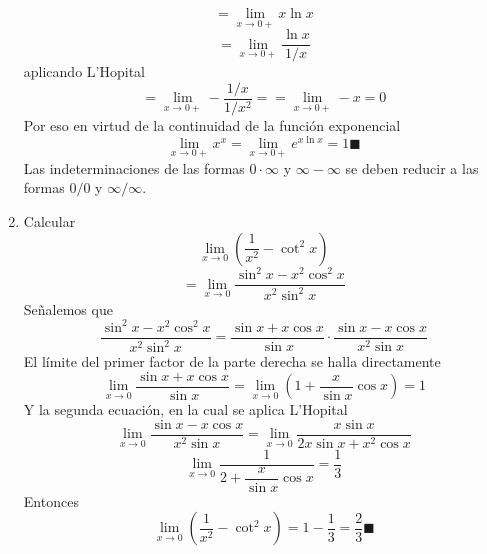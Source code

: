 \documentclass[10pt,twoside]{SelfArx} %
\begin{document}
\begin{enumerate}
\begin{equation}
\end{equation}
   	\begin{equation}
	=\lim\limits_{x\rightarrow0+}x\ln x
   	\end{equation}
   	\begin{equation}
   		=\lim\limits_{x\rightarrow0+}\dfrac{\ln x}{1/x} 
 	\end{equation}
 	aplicando L'Hopital
 	\begin{equation}
 		=\lim\limits_{x\rightarrow0+}-\dfrac{1/x}{1/x^{2}}=	=\lim\limits_{x\rightarrow0+}-x=0
 	\end{equation}
   	Por eso en virtud de la continuidad de la función exponencial
   	\begin{equation}
   	\lim\limits_{x\rightarrow0+}x^{x}=\lim\limits_{x\rightarrow0+}e^{x\ln x}=1\blacksquare
   	\end{equation}
   	Las indeterminaciones de las formas $ 0\cdot \infty $ y $ \infty-\infty $ se deben reducir a las formas $ 0/0 $ y $ \infty/\infty $.
   	\item Calcular\\
   	\begin{equation}
   	\lim\limits_{x\rightarrow0}\left (\dfrac{1}{x^{2}}-\cot^{2}x\right )
   	\end{equation}
   	\begin{equation}
   	=\lim\limits_{x\rightarrow0}\dfrac{\sin^{2}x-x^{2}\cos^{2}x}{x^{2}\sin^{2}x}
   	\end{equation}
   	Señalemos que 
   	\[  \dfrac{\sin^{2}x-x^{2}\cos^{2}x}{x^{2}\sin^{2}x}=\dfrac{\sin x+x\cos x}{\sin x}\cdot\dfrac{\sin x-x\cos x}{x^{2}\sin x}\]
   	El límite del primer factor de la parte derecha se halla directamente
   	\begin{equation}
   	\lim\limits_{x\rightarrow0}\dfrac{\sin x+x\cos x}{\sin x}=\lim\limits_{x\rightarrow0}\left (1+\dfrac{x}{\sin x}\cos x\right )=1
   	\end{equation}
   	Y la segunda ecuaci\'on, en la cual se aplica L'Hopital
   	\begin{equation}
   	\lim\limits_{x\rightarrow0}\dfrac{\sin x-x\cos x}{x^{2}\sin x}=\lim\limits_{x\rightarrow0}\dfrac{x\sin x}{2x\sin x+x^{2}\cos x}
   	\end{equation}
   	\begin{equation}
   	\lim\limits_{x\rightarrow0}\dfrac{1}{2+\dfrac{x}{\sin x}\cos x}=\dfrac{1}{3}
   	\end{equation}
Entonces
\begin{equation}
  	\lim\limits_{x\rightarrow0}\left (\dfrac{1}{x^{2}}-\cot^{2}x\right )=1-\dfrac{1}{3}=\dfrac{2}{3}\blacksquare
\end{equation}   	
   	
   	
   	
   \end{enumerate}%
   
\end{document}
